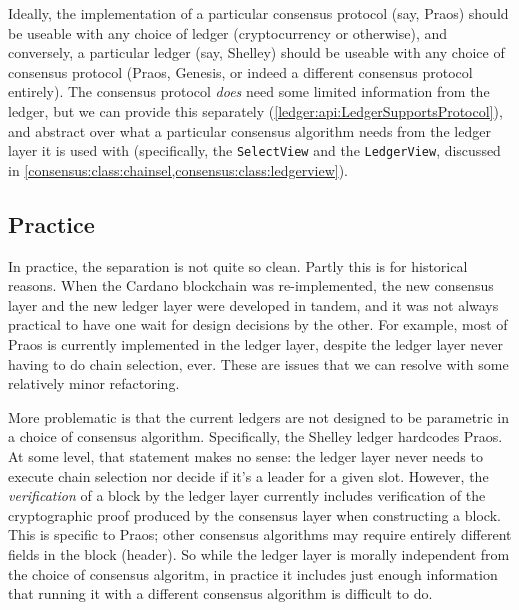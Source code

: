 Ideally, the implementation of a particular consensus protocol (say, Praos)
should be useable with any choice of ledger (cryptocurrency or otherwise), and
conversely, a particular ledger (say, Shelley) should be useable with any choice
of consensus protocol  (Praos, Genesis, or indeed a different consensus protocol
entirely). The consensus protocol \emph{does} need some limited information from
the ledger, but we can provide this separately
(\cref{ledger:api:LedgerSupportsProtocol}), and abstract over what a particular
consensus algorithm needs from the ledger layer it is used with (specifically,
the \lstinline!SelectView! and the \lstinline!LedgerView!, discussed in
\cref{consensus:class:chainsel,consensus:class:ledgerview}).

\subsection{Practice}

In practice, the separation is not quite so clean. Partly this is for
historical reasons. When the Cardano blockchain was re-implemented, the new
consensus layer and the new ledger layer were developed in tandem, and it was
not always practical to have one wait for design decisions by the other.
For example, most of Praos is currently implemented in the ledger layer,
despite the ledger layer never having to do chain selection, ever. These are
issues that we can resolve with some relatively minor refactoring.

More problematic is that the current ledgers are not designed to be parametric
in a choice of consensus algorithm. Specifically, the Shelley ledger hardcodes
Praos. At some level, that statement makes no sense: the ledger layer never
needs to execute chain selection nor decide if it's a leader for a given slot.
However, the \emph{verification} of a block by the ledger layer currently
includes verification of the cryptographic proof produced by the consensus layer
when constructing a block. This is specific to Praos; other consensus algorithms
may require entirely different fields in the block (header). So while the ledger
layer is morally independent from the choice of consensus algoritm, in practice
it includes just enough information that running it with a different consensus
algorithm is difficult to do.

